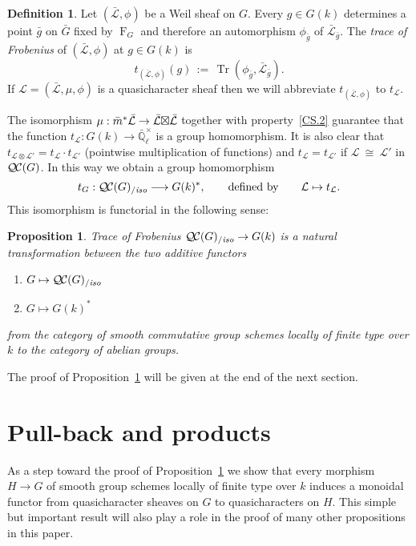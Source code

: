 \documentclass[11pt]{amsart}
\theoremstyle{plain}
\newtheorem{proposition}[theorem]{Proposition}
\theoremstyle{definition}
\newtheorem{definition}[theorem]{Definition}
\theoremstyle{remark}
\newcommand{\EE}{\mathbb{\bar Q}_\ell}
\newcommand{\Fq}{k}
\newcommand{\EEx}{\EE^\times}
\newcommand{\Frob}[1]{\operatorname{F}_{#1}}
\DeclareMathOperator{\trace}{Tr}
\newcommand{\cdef}[1]{ {#1}\index{#1} }
\newcommand{\ceq}{{\, :=\, }}
\newcommand{\iso}{{\ \cong\ }}
\newcommand{\qcs}[1]{{\mathcal{#1}}}
\newcommand{\gqcs}[1]{{\mathcal{\bar #1}}}
\newcommand{\QC}{{\mathcal{Q\hskip-0.8pt C}}}
\newcommand{\QCiso}[1]{\QC(#1)_{/\textit{iso}}}
\newcommand{\trFrob}[1]{t_{#1}}
\newcommand{\bg}{\bar{g}}
\newcommand{\bm}{\bar{m}}
\newcommand{\bG}{\bar{G}}
\newcommand{\tight}[3]{\hspace{-#1pt}{#2}\hspace{-#3pt}}
\newcommand{\LxL}{\text{$\gqcs{L} \tight{0}{\boxtimes}{0} \gqcs{L}$}}
\newcommand\David[1]{\marginpar{\smaller\smaller DR: #1}}
\begin{document}
\begin{definition}\label{def:trFrob}
Let $(\gqcs{L},\phi)$ be a Weil sheaf on $G$. Every $g\in G(\Fq)$
determines a point $\bg$ on $\bG$ fixed by $\Frob{G}$ and
therefore an automorphism $\phi_{\bg}$ of $\gqcs{L}_{\bg}$. The \emph{trace of Frobenius} of $(\gqcs{L},\phi)$ at $g\in G(\Fq)$ is 
\[
\trFrob{(\gqcs{L},\phi)}(g) \ceq \trace(\phi_{\bg}, \gqcs{L}_{\bg}).
\]
If $\qcs{L} = (\gqcs{L},\mu,\phi)$ is a quasicharacter sheaf
then we will abbreviate $\trFrob{(\gqcs{L},\phi)}$ to $\trFrob{\qcs{L}}$.
\end{definition}

The isomorphism $\mu : \bm^* \gqcs{L} \to \LxL$ together with property~\ref{CS.2} guarantee
that the function $\trFrob{\qcs{L}} : G(\Fq)\to \EEx$ is a group homomorphism.
It is also clear that $\trFrob{\qcs{L}\otimes \qcs{L'}} = \trFrob{\qcs{L}} \cdot \trFrob{\qcs{L'}}$
(pointwise multiplication of functions) and $\trFrob{\qcs{L}} = \trFrob{\qcs{L'}}$
if $\qcs{L} \iso \qcs{L'}$ in $\QC(G)$. In this way we obtain a group homomorphism
\[
\cdef{\trFrob{G}} : \QCiso{G} \longrightarrow G(\Fq)^*,
\qquad \text{defined by}\qquad \qcs{L} \mapsto \trFrob{\qcs{L}}.
\]
This isomorphism is functorial in the following sense:

\begin{proposition}\label{prop:functorialG}
Trace of Frobenius $\QCiso{G} \to G(\Fq)$ is a natural transformation 
between the two additive functors 
\begin{enumerate}
\item[$F_1$:] $G \mapsto \QCiso{G}$
\item[$F_2$:] $G \mapsto G(\Fq)^*$
\end{enumerate}
from the category of smooth commutative
group schemes locally of finite type over $\Fq$ to the category of abelian groups.
\end{proposition}

The proof of Proposition~\ref{prop:functorialG} will be given at the end of the next section.

\section{Pull-back and products}\label{sec:pullback}

As a step toward the proof of Proposition~\ref{prop:functorialG} we show that every morphism  $H \to G$ of smooth group schemes locally of finite type over $\Fq$ induces a monoidal functor from quasicharacter sheaves on $G$ to quasicharacters on $H$. This simple but important result will also play a role in the proof of many other propositions in this paper.
\end{document}
